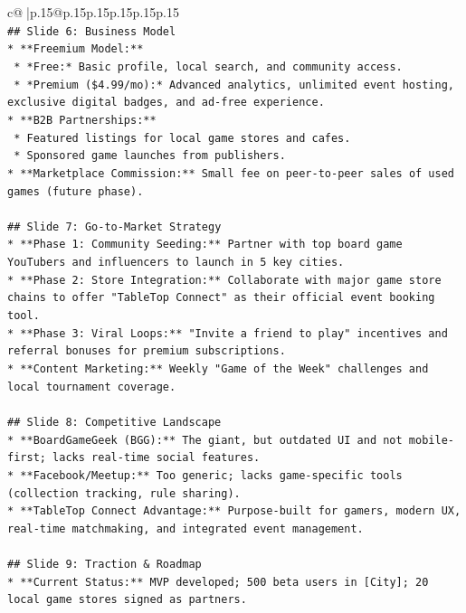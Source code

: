 \documentclass{article}
\begin{document}
{\begin{supertabular}{c@{$\;$}|p{.15\linewidth}@{}p{.15\linewidth}p{.15\linewidth}p{.15\linewidth}p{.15\linewidth}p{.15\linewidth}}
{{{\\ 
\texttt{\#\# Slide 6: Business Model} \\
\texttt{*   **Freemium Model:**} \\
\texttt{    *   *Free:* Basic profile, local search, and community access.} \\
\texttt{    *   *Premium (\$4.99/mo):* Advanced analytics, unlimited event hosting, exclusive digital badges, and ad{-}free experience.} \\
\texttt{*   **B2B Partnerships:**} \\
\texttt{    *   Featured listings for local game stores and cafes.} \\
\texttt{    *   Sponsored game launches from publishers.} \\
\texttt{*   **Marketplace Commission:** Small fee on peer{-}to{-}peer sales of used games (future phase).} \\
\\ 
\texttt{\#\# Slide 7: Go{-}to{-}Market Strategy} \\
\texttt{*   **Phase 1: Community Seeding:** Partner with top board game YouTubers and influencers to launch in 5 key cities.} \\
\texttt{*   **Phase 2: Store Integration:** Collaborate with major game store chains to offer "TableTop Connect" as their official event booking tool.} \\
\texttt{*   **Phase 3: Viral Loops:** "Invite a friend to play" incentives and referral bonuses for premium subscriptions.} \\
\texttt{*   **Content Marketing:** Weekly "Game of the Week" challenges and local tournament coverage.} \\
\\ 
\texttt{\#\# Slide 8: Competitive Landscape} \\
\texttt{*   **BoardGameGeek (BGG):** The giant, but outdated UI and not mobile{-}first; lacks real{-}time social features.} \\
\texttt{*   **Facebook/Meetup:** Too generic; lacks game{-}specific tools (collection tracking, rule sharing).} \\
\texttt{*   **TableTop Connect Advantage:** Purpose{-}built for gamers, modern UX, real{-}time matchmaking, and integrated event management.} \\
\\ 
\texttt{\#\# Slide 9: Traction \& Roadmap} \\
\texttt{*   **Current Status:** MVP developed; 500 beta users in {[}City{]}; 20 local game stores signed as partners.} \\
}}}
\end{supertabular}}
\end{document}
